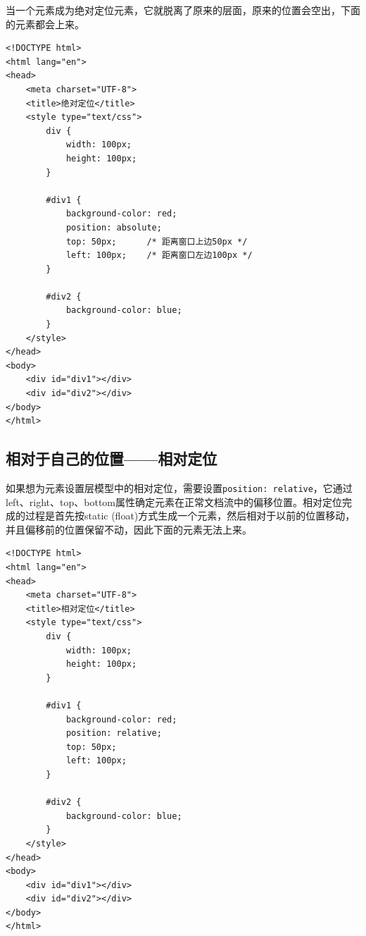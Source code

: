 当一个元素成为绝对定位元素，它就脱离了原来的层面，原来的位置会空出，下面的元素都会上来。

\begin{lstlisting}[style=htmlcssjs, title=绝对定位]
<!DOCTYPE html>
<html lang="en">
<head>
    <meta charset="UTF-8">
    <title>绝对定位</title>
    <style type="text/css">
        div {
            width: 100px;
            height: 100px;
        }

        #div1 {
            background-color: red;
            position: absolute;
            top: 50px;      /* 距离窗口上边50px */
            left: 100px;    /* 距离窗口左边100px */
        }

        #div2 {
            background-color: blue;
        }
    </style>
</head>
<body>
    <div id="div1"></div>
    <div id="div2"></div>
</body>
</html>
\end{lstlisting}

\begin{figure}[H]
    \centering
\end{figure}

\subsection{相对于自己的位置——相对定位}

如果想为元素设置层模型中的相对定位，需要设置\lstinline|position: relative|，它通过left、right、top、bottom属性确定元素在正常文档流中的偏移位置。相对定位完成的过程是首先按static (float)方式生成一个元素，然后相对于以前的位置移动，并且偏移前的位置保留不动，因此下面的元素无法上来。

\begin{lstlisting}[style=htmlcssjs, title=相对定位]
<!DOCTYPE html>
<html lang="en">
<head>
    <meta charset="UTF-8">
    <title>相对定位</title>
    <style type="text/css">
        div {
            width: 100px;
            height: 100px;
        }

        #div1 {
            background-color: red;
            position: relative;
            top: 50px;
            left: 100px;
        }

        #div2 {
            background-color: blue;
        }
    </style>
</head>
<body>
    <div id="div1"></div>
    <div id="div2"></div>
</body>
</html>
\end{lstlisting}

